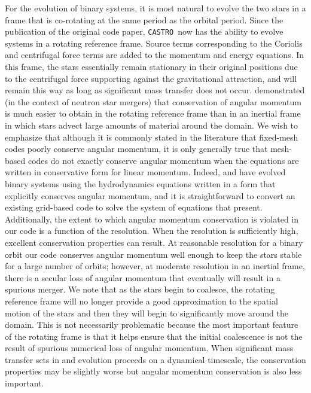 \documentclass[iop,numberedappendix]{../emulateapj}
\newcommand{\castro}{\texttt{CASTRO}}
\begin{document}
For the evolution of binary systems, it is most natural to evolve the
two stars in a frame that is co-rotating at the same period as the
orbital period. Since the publication of the original code paper, \castro\ 
now has the ability to evolve systems in a rotating reference frame. 
Source terms corresponding to the Coriolis and centrifugal 
force terms are added to the momentum and energy equations. In this frame, 
the stars essentially remain stationary in their original positions due to the
centrifugal force supporting against the gravitational attraction, and
will remain this way as long as significant mass transfer does not
occur. \cite{swc:2000} demonstrated (in the context of neutron star
mergers) that conservation of angular momentum is much easier to
obtain in the rotating reference frame than in an inertial frame in
which stars advect large amounts of material around the domain. We
wish to emphasize that although it is commonly stated in the
literature that fixed-mesh codes poorly conserve angular momentum,
it is only generally true that mesh-based codes do not exactly conserve 
angular momentum when the equations are written in conservative form
for linear momentum. Indeed, \cite{motl:2002} and \cite{byerly:2014} 
have evolved binary systems using the hydrodynamics equations written 
in a form that explicitly conserves angular momentum, and it is 
straightforward to convert an existing grid-based code to solve 
the system of equations that \citeauthor{byerly:2014} present.
Additionally, the extent to which angular momentum conservation is violated in our code
is a function of the resolution. When the resolution is sufficiently high, 
excellent conservation properties can result. At reasonable resolution 
for a binary orbit our code conserves angular momentum well enough 
to keep the stars stable for a large number of orbits; however, at moderate 
resolution in an inertial frame, there is a secular loss of angular 
momentum that eventually will result in a spurious merger.
We note that as the stars begin to coalesce, the rotating reference frame
will no longer provide a good approximation to the spatial motion of
the stars and then they will begin to significantly move around the
domain. This is not necessarily problematic because the most important
feature of the rotating frame is that it helps ensure that the initial
coalescence is not the result of spurious numerical loss of angular
momentum. When significant mass transfer sets in and evolution
proceeds on a dynamical timescale, the conservation properties may be
slightly worse but angular momentum conservation is also less
important.
\end{document}
